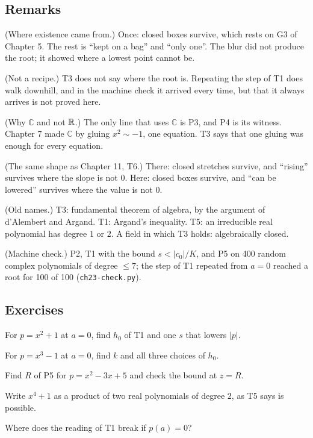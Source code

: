 \subsection*{Remarks}

\begin{lines}
\item[\lab{R1}] (Where existence came from.) Once: closed boxes survive, which rests on G3 of Chapter 5. The rest is ``kept on a bag'' and ``only one''. The blur did not produce the root; it showed where a lowest point cannot be.
\item[\lab{R2}] (Not a recipe.) T3 does not say where the root is. Repeating the step of T1 does walk downhill, and in the machine check it arrived every time, but that it always arrives is not proved here.
\item[\lab{R3}] (Why $\mathbb{C}$ and not $\mathbb{R}$.) The only line that uses $\mathbb{C}$ is P3, and P4 is its witness. Chapter 7 made $\mathbb{C}$ by gluing $x^2 \sim -1$, one equation. T3 says that one gluing was enough for every equation.
\item[\lab{R4}] (The same shape as Chapter 11, T6.) There: closed stretches survive, and ``rising'' survives where the slope is not $0$. Here: closed boxes survive, and ``can be lowered'' survives where the value is not $0$.
\item[\lab{R5}] (Old names.) T3: fundamental theorem of algebra, by the argument of d'Alembert and Argand. T1: Argand's inequality. T5: an irreducible real polynomial has degree $1$ or $2$. A field in which T3 holds: algebraically closed.
\item[\lab{R6}] (Machine check.) P2, T1 with the bound $s < |c_0|/K$, and P5 on 400 random complex polynomials of degree $\le 7$; the step of T1 repeated from $a = 0$ reached a root for 100 of 100 (\texttt{ch23-check.py}).
\end{lines}

\subsection*{Exercises}

\begin{lines}
\item[\lab{E1}] For $p = x^2 + 1$ at $a = 0$, find $h_0$ of T1 and one $s$ that lowers $|p|$.
\item[\lab{E2}] For $p = x^3 - 1$ at $a = 0$, find $k$ and all three choices of $h_0$.
\item[\lab{E3}] Find $R$ of P5 for $p = x^2 - 3x + 5$ and check the bound at $z = R$.
\item[\lab{E4}] Write $x^4 + 1$ as a product of two real polynomials of degree $2$, as T5 says is possible.
\item[\lab{E5}] Where does the reading of T1 break if $p(a) = 0$?
\end{lines}

